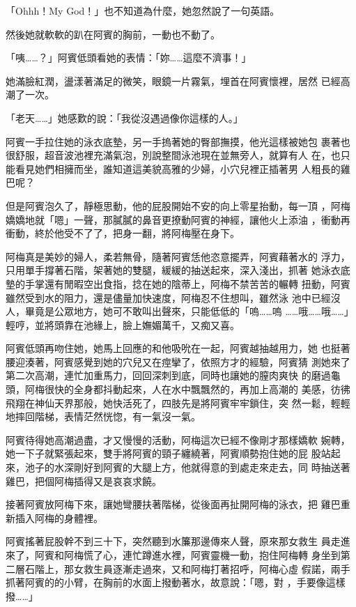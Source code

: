 「Ohhh！My God！」也不知道為什麼，她忽然說了一句英語。

然後她就軟軟的趴在阿賓的胸前，一動也不動了。

「咦……？」阿賓低頭看她的表情：「妳……這麼不濟事！」

她滿臉紅潤，盪漾著滿足的微笑，眼鏡一片霧氣，埋首在阿賓懷裡，居然
已經高潮了一次。

「老天……」她感歎的說：「我從沒遇過像你這樣的人。」

阿賓一手拉住她的泳衣底墊，另一手摀著她的臀部撫摸，他光這樣被她包
裹著也很舒服，超音波池裡充滿氣泡，別說整間泳池現在並無旁人，就算有人
在，也只能看見她們相擁而坐，誰知道這美貌高雅的少婦，小穴兒裡正插著男
人粗長的雞巴呢？

但是阿賓泡久了，靜極思動，他的屁股開始不安的向上零星抬動，每一頂
，阿梅嬌嬌地就「嗯」一聲，那膩膩的鼻音更撩動阿賓的神經，讓他火上添油
，衝動再衝動，終於他受不了了，把身一翻，將阿梅壓在身下。

阿梅真是美妙的婦人，柔若無骨，隨著阿賓恁他恣意擺弄，阿賓藉著水的
浮力，只用單手撐著石階，架著她的雙腿，緩緩的抽送起來，深入淺出，抓著
她泳衣底墊的手掌還有閒暇空出食指，捻在她的陰蒂上，阿梅不禁苦苦的輾轉
扭動，阿賓雖然受到水的阻力，還是儘量加快速度，阿梅忍不住想叫，雖然泳
池中已經沒人，畢竟是公眾地方，她可不敢叫出聲來，只能低低的「嗚……嗚
……哦……哦……」輕哼，並將頭靠在池緣上，臉上嫵媚萬千，又痴又喜。

阿賓低頭再吻住她，她馬上回應的和他吸吮在一起，阿賓越抽越用力，她
也挺著腰迎湊著，阿賓感覺到她的穴兒又在痙攣了，依照方才的經驗，阿賓猜
測她來了第二次高潮，連忙加重馬力，回回深刺到底，同時也讓她的膣肉爽快
的磨過龜頭，阿梅很快的全身都抖動起來，人在水中飄飄然的，再加上高潮的
美感，彷彿飛翔在神仙天界那般，她快活死了，四肢先是將阿賓牢牢鎖住，突
然一鬆，輕輕地摔回階梯，表情茫然恍惚，有一氣沒一氣。

阿賓待得她高潮過盡，才又慢慢的活動，阿梅這次已經不像剛才那樣嬌軟
婉轉，她一下子就緊張起來，雙手將阿賓的頸子纏繞著，阿賓順勢抱住她的屁
股站起來，池子的水深剛好到阿賓的大腿上方，他就得意的到處走來走去，同
時抽送著雞巴，把個阿梅插得又是哀哀求饒。

接著阿賓放阿梅下來，讓她彎腰扶著階梯，從後面再扯開阿梅的泳衣，把
雞巴重新插入阿梅的身體裡。

阿賓搖著屁股幹不到三十下，突然聽到水簾那邊傳來人聲，原來那女救生
員走進來了，阿賓和阿梅慌了心，連忙蹲進水裡，阿賓靈機一動，抱住阿梅轉
身坐到第二層石階上，那女救生員逐漸走過來，又和阿梅打著招呼，阿梅心虛
假諾，兩手抓著阿賓的的小臂，在胸前的水面上撥動著水，故意說：「嗯，對
，手要像這樣撥……」


